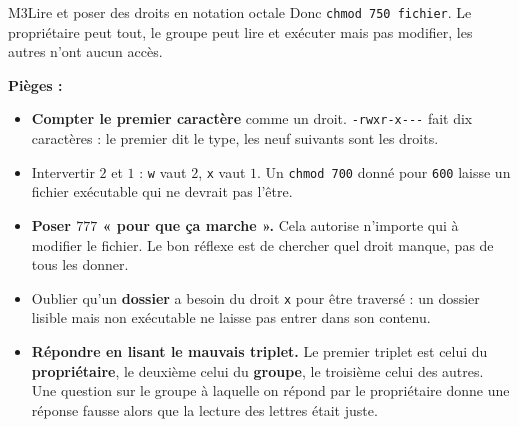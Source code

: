\begin{fichemethode}{M3}{Lire et poser des droits en notation octale}
Donc \lstinline{chmod 750 fichier}. Le propriétaire peut tout, le groupe peut lire et
exécuter mais pas modifier, les autres n'ont aucun accès.



\textbf{Pièges :}
\begin{itemize}
  \item \textbf{Compter le premier caractère} comme un droit. \lstinline{-rwxr-x---} fait
    dix caractères : le premier dit le type, les neuf suivants sont les droits.
  \item Intervertir $2$ et $1$ : \lstinline{w} vaut $2$, \lstinline{x} vaut $1$. Un
    \lstinline{chmod 700} donné pour \lstinline{600} laisse un fichier exécutable qui ne
    devrait pas l'être.
  \item \textbf{Poser $777$ « pour que ça marche ».} Cela autorise n'importe qui à modifier
    le fichier. Le bon réflexe est de chercher quel droit manque, pas de tous les donner.
  \item Oublier qu'un \textbf{dossier} a besoin du droit \lstinline{x} pour être traversé :
    un dossier lisible mais non exécutable ne laisse pas entrer dans son contenu.
  \item \textbf{Répondre en lisant le mauvais triplet.} Le premier triplet est celui du
    \textbf{propriétaire}, le deuxième celui du \textbf{groupe}, le troisième celui des
    autres. Une question sur le groupe à laquelle on répond par le propriétaire donne une
    réponse fausse alors que la lecture des lettres était juste.
\end{itemize}


\end{fichemethode}
